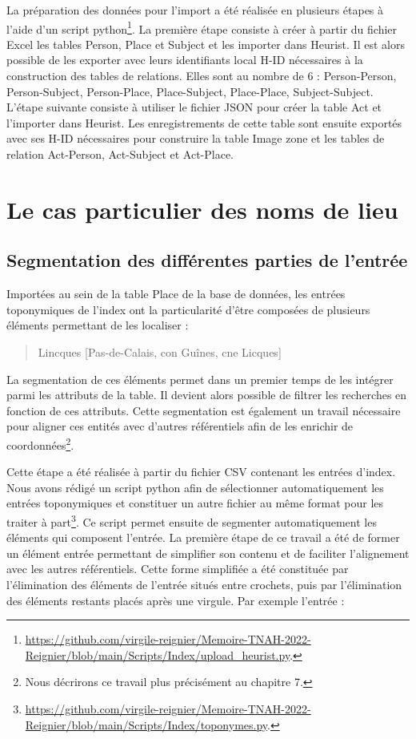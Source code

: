 \documentclass[a4paper,12pt,twoside]{book}
\begin{document}
	La préparation des données pour l'import a été réalisée en plusieurs étapes à l'aide d'un script python\footnote{\url{https://github.com/virgile-reignier/Memoire-TNAH-2022-Reignier/blob/main/Scripts/Index/upload_heurist.py}.}. La première étape consiste à créer à partir du fichier Excel les tables Person, Place et Subject et les importer dans Heurist. Il est alors possible de les exporter avec leurs identifiants local H-ID nécessaires à la construction des tables de relations. Elles sont au nombre de 6 : Person-Person, Person-Subject, Person-Place, Place-Subject, Place-Place, Subject-Subject. L'étape suivante consiste à utiliser le fichier JSON pour créer la table Act et l'importer dans Heurist. Les enregistrements de cette table sont ensuite exportés avec ses H-ID nécessaires pour construire la table Image zone et les tables de relation Act-Person, Act-Subject et Act-Place.
	
	\section{Le cas particulier des noms de lieu}
	
	\subsection{Segmentation des différentes parties de l'entrée}
	
	Importées au sein de la table Place de la base de données, les entrées toponymiques de l'index ont la particularité d'être composées de plusieurs éléments permettant de les localiser :
	
	 \begin{quotation}
	 	Lincques [Pas-de-Calais, con Guînes, cne Licques]
	 \end{quotation}
	
	
	\noindent La segmentation de ces éléments permet dans un premier temps de les intégrer parmi les attributs de la table. Il devient alors possible de filtrer les recherches en fonction de ces attributs. Cette segmentation est également un travail nécessaire pour aligner ces entités avec d'autres référentiels afin de les enrichir de coordonnées\footnote{Nous décrirons ce travail plus précisément au chapitre 7.}.
	
	Cette étape a été réalisée à partir du fichier CSV contenant les entrées d'index. Nous avons rédigé un script python afin de sélectionner automatiquement les entrées toponymiques et constituer un autre fichier au même format pour les traiter à part\footnote{\url{https://github.com/virgile-reignier/Memoire-TNAH-2022-Reignier/blob/main/Scripts/Index/toponymes.py}.}. Ce script permet ensuite de segmenter automatiquement les éléments qui composent l'entrée. La première étape de ce travail a été de former un élément \og entrée\fg{} permettant de simplifier son contenu et de faciliter l'alignement avec les autres référentiels. Cette forme simplifiée a été constituée par l'élimination des éléments de l'entrée situés entre crochets, puis par l'élimination des éléments restants placés après une virgule. Par exemple l'entrée :
	
\end{document}
